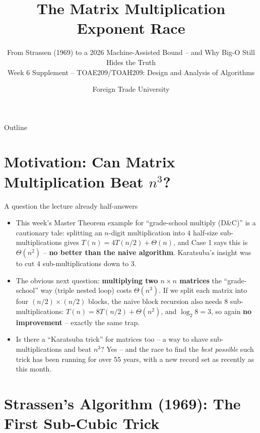 \documentclass[11pt,aspectratio=169]{beamer}
\title{The Matrix Multiplication Exponent Race}
\subtitle{From Strassen (1969) to a 2026 Machine-Assisted Bound -- and Why Big-O Still
Hides the Truth\\
\small Week 6 Supplement -- TOAE209/TOAH209: Design and Analysis of Algorithms}
\author{Foreign Trade University}
\date{}
\begin{document}
\begin{frame}
  \titlepage
\end{frame}

\begin{frame}{Outline}
  \tableofcontents
\end{frame}

\section{Motivation: Can Matrix Multiplication Beat \texorpdfstring{$n^3$}{n cubed}?}

\begin{frame}{A question the lecture already half-answers}
  \begin{itemize}
    \item This week's Master Theorem example for ``grade-school multiply (D\&C)'' is a
    cautionary tale: splitting an $n$-digit multiplication into $4$ half-size
    sub-multiplications gives $T(n) = 4T(n/2) + \Theta(n)$, and Case 1 says this is
    $\Theta(n^2)$ -- \textbf{no better than the naive algorithm}. Karatsuba's insight was
    to cut $4$ sub-multiplications down to $3$.
    \item The obvious next question: \textbf{multiplying two $n \times n$ matrices} the
    ``grade-school'' way (triple nested loop) costs $\Theta(n^3)$. If we split each matrix
    into four $(n/2)\times(n/2)$ blocks, the naive block recursion also needs $8$
    sub-multiplications: $T(n) = 8T(n/2) + \Theta(n^2)$, and $\log_2 8 = 3$, so again
    \textbf{no improvement} -- exactly the same trap.
    \item Is there a ``Karatsuba trick'' for matrices too -- a way to shave sub-multiplications
    and beat $n^3$? Yes -- and the race to find the \emph{best possible} such trick has been
    running for over 55 years, with a new record set as recently as this month.
  \end{itemize}
\end{frame}

\section{Strassen's Algorithm (1969): The First Sub-Cubic Trick}
\end{document}
